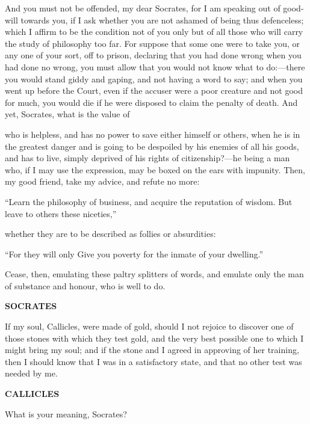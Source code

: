\documentclass[11pt,letter]{article}
\begin{document}
\par  And you must not be offended, my dear Socrates, for I am speaking out of good-will towards you, if I ask whether you are not ashamed of being thus defenceless; which I affirm to be the condition not of you only but of all those who will carry the study of philosophy too far. For suppose that some one were to take you, or any one of your sort, off to prison, declaring that you had done wrong when you had done no wrong, you must allow that you would not know what to do:—there you would stand giddy and gaping, and not having a word to say; and when you went up before the Court, even if the accuser were a poor creature and not good for much, you would die if he were disposed to claim the penalty of death. And yet, Socrates, what is the value of
 
\par  who is helpless, and has no power to save either himself or others, when he is in the greatest danger and is going to be despoiled by his enemies of all his goods, and has to live, simply deprived of his rights of citizenship?—he being a man who, if I may use the expression, may be boxed on the ears with impunity. Then, my good friend, take my advice, and refute no more:

\par  “Learn the philosophy of business, and acquire the reputation of wisdom. But leave to others these niceties,”

\par  whether they are to be described as follies or absurdities:

\par  “For they will only Give you poverty for the inmate of your dwelling.”

\par  Cease, then, emulating these paltry splitters of words, and emulate only the man of substance and honour, who is well to do.

\par \textbf{SOCRATES}
\par   If my soul, Callicles, were made of gold, should I not rejoice to discover one of those stones with which they test gold, and the very best possible one to which I might bring my soul; and if the stone and I agreed in approving of her training, then I should know that I was in a satisfactory state, and that no other test was needed by me.

\par \textbf{CALLICLES}
\par   What is your meaning, Socrates?
\end{document}
